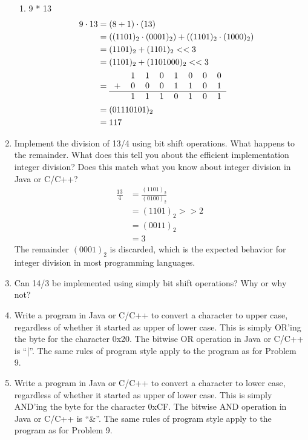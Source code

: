 \documentclass[12pt]{article}
\begin{document}
\begin{enumerate}
\begin{enumerate}
      \item 9 * 13
      \begin{align*}
        9 \cdot 13 &= (8 + 1) \cdot (13) \\
        &= ((1101)_2 \cdot (0001)_2) + ((1101)_2 \cdot (1000)_2) \\
        &= (1101)_2+ (1101)_2 << 3 \\
        &= (1101)_2+ (110 1000)_2 << 3 \\
        &= \begin{tabular}{cccccccc}
          & 1 & 1 & 0 & 1 & 0 & 0 & 0 \\
        + & 0 & 0 & 0 & 1 & 1 & 0 & 1 \\
        \hline
          & 1 & 1 & 1 & 0 & 1 & 0 & 1 \\
        \end{tabular} \\
        &= (0111 0101)_2 \\
        &= 117
      \end{align*}
    \end{enumerate}

    \item Implement the division of 13/4 using bit shift operations. What happens to the remainder. What does this tell you about the efficient implementation integer division? Does this match what you know about integer division in Java or C/C++?
    \begin{align*}
      \frac{13}{4} &= \frac{(1101)_2}{(0100)_2} \\
      &= (1101)_2 >> 2 \\
      &= (0011)_2 \\
      &= 3
    \end{align*}
    The remainder $(0001)_2$ is discarded, which is the expected behavior for integer division in most programming languages.

    \item Can 14/3 be implemented using simply bit shift operations? Why or why not?

    \item Write a program in Java or C/C++ to convert a character to upper case, regardless of whether it started as upper of lower case. This is simply OR’ing the byte for the character 0x20. The bitwise OR operation in Java or C/C++ is ``|''. The same rules of program style apply to the program as for Problem 9.

    \item Write a program in Java or C/C++ to convert a character to lower case, regardless of whether it started as upper of lower case. This is simply AND’ing the byte for the character 0xCF. The bitwise AND operation in Java or C/C++ is ``\&''. The same rules of program style apply to the program as for Problem 9.


\end{enumerate}
\end{document}
